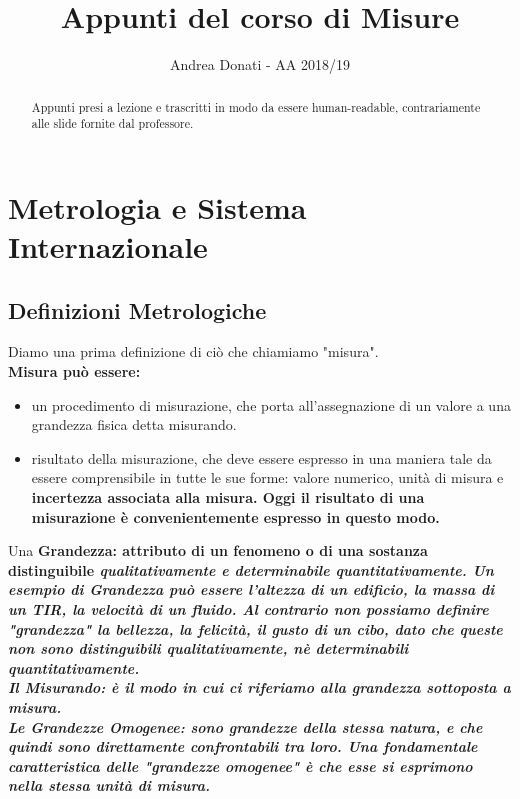 \documentclass[a4paper,11pt]{report}
\title{Appunti del corso di Misure}
\author{Andrea Donati - AA 2018/19}
\begin{document}
\maketitle
\tableofcontents

\begin{abstract}
Appunti presi a lezione e trascritti in modo da essere human-readable, contrariamente alle slide fornite dal professore.
\end{abstract}
\newpage
\chapter{Metrologia e Sistema Internazionale}
\section{Definizioni Metrologiche}
Diamo una prima definizione di ciò che chiamiamo "misura".\\
\bf Misura \rm può essere:

\begin{itemize}
  \item un procedimento di misurazione, che porta all'assegnazione di un valore a una grandezza fisica detta misurando.
  \item risultato della misurazione, che deve essere espresso in una maniera tale da essere comprensibile in tutte le sue forme: valore numerico, unità di misura e \bf incertezza \rm associata alla misura. Oggi il risultato di una misurazione è convenientemente espresso in questo modo.
\end{itemize}

Una \bf Grandezza\rm: attributo di un fenomeno o di una sostanza distinguibile \it qualitativamente \rm e determinabile \it quantitativamente\rm. Un esempio di Grandezza può essere l'altezza di un edificio, la \bf massa \rm di un TIR, la velocità di un fluido. Al contrario non possiamo definire "grandezza" la bellezza, la felicità, il gusto di un cibo, dato che queste non sono distinguibili qualitativamente, nè determinabili quantitativamente.
\\

Il \bf Misurando\rm: è il modo in cui ci riferiamo alla grandezza sottoposta a misura.
\\ 

Le \bf Grandezze Omogenee\rm: sono grandezze della stessa natura, e che quindi sono direttamente confrontabili tra loro. Una fondamentale caratteristica delle "grandezze omogenee" è che esse si esprimono nella
\bf stessa unità di misura\rm.
\\
\end{document}
